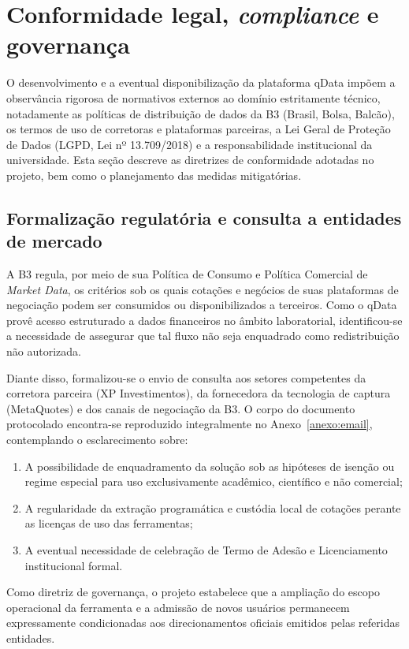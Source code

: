 \section{Conformidade legal, \textit{compliance} e governança}
\label{sec:conformidade}

O desenvolvimento e a eventual disponibilização da plataforma qData impõem a observância rigorosa de normativos externos ao domínio estritamente técnico, notadamente as políticas de distribuição de dados da B3 (Brasil, Bolsa, Balcão), os termos de uso de corretoras e plataformas parceiras, a Lei Geral de Proteção de Dados (LGPD, Lei nº 13.709/2018) e a responsabilidade institucional da universidade. Esta seção descreve as diretrizes de conformidade adotadas no projeto, bem como o planejamento das medidas mitigatórias.

\subsection{Formalização regulatória e consulta a entidades de mercado}

A B3 regula, por meio de sua Política de Consumo e Política Comercial de \textit{Market Data}, os critérios sob os quais cotações e negócios de suas plataformas de negociação podem ser consumidos ou disponibilizados a terceiros. Como o qData provê acesso estruturado a dados financeiros no âmbito laboratorial, identificou-se a necessidade de assegurar que tal fluxo não seja enquadrado como redistribuição não autorizada.

Diante disso, formalizou-se o envio de consulta aos setores competentes da corretora parceira (XP Investimentos), da fornecedora da tecnologia de captura (MetaQuotes) e dos canais de negociação da B3. O corpo do documento protocolado encontra-se reproduzido integralmente no Anexo~\ref{anexo:email}, contemplando o esclarecimento sobre:
\begin{enumerate}
    \item A possibilidade de enquadramento da solução sob as hipóteses de isenção ou regime especial para uso exclusivamente acadêmico, científico e não comercial;
    \item A regularidade da extração programática e custódia local de cotações perante as licenças de uso das ferramentas;
    \item A eventual necessidade de celebração de Termo de Adesão e Licenciamento institucional formal.
\end{enumerate}
Como diretriz de governança, o projeto estabelece que a ampliação do escopo operacional da ferramenta e a admissão de novos usuários permanecem expressamente condicionadas aos direcionamentos oficiais emitidos pelas referidas entidades.

